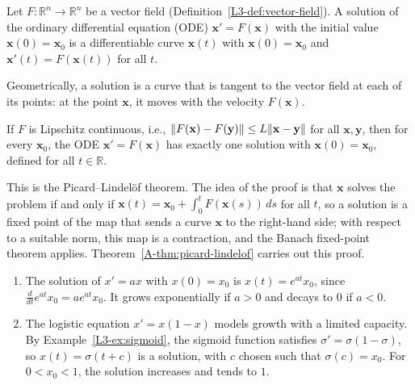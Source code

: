 \begin{definition}\label{L3-def:ode}
    Let $F: \mathbb{R}^n \to \mathbb{R}^n$ be a vector field (Definition~\ref{L3-def:vector-field}). A solution of the ordinary differential equation (ODE) $\mathbf{x}' = F(\mathbf{x})$ with the initial value $\mathbf{x}(0) = \mathbf{x}_0$ is a differentiable curve $\mathbf{x}(t)$ with $\mathbf{x}(0) = \mathbf{x}_0$ and $\mathbf{x}'(t) = F(\mathbf{x}(t))$ for all $t$.
\end{definition}

Geometrically, a solution is a curve that is tangent to the vector field at each of its points: at the point $\mathbf{x}$, it moves with the velocity $F(\mathbf{x})$.

\begin{theorem}\label{L3-thm:picard}
    If $F$ is Lipschitz continuous, i.e., $\lVert F(\mathbf{x}) - F(\mathbf{y}) \rVert \leq L\lVert \mathbf{x} - \mathbf{y} \rVert$ for all $\mathbf{x}, \mathbf{y}$, then for every $\mathbf{x}_0$, the ODE $\mathbf{x}' = F(\mathbf{x})$ has exactly one solution with $\mathbf{x}(0) = \mathbf{x}_0$, defined for all $t \in \mathbb{R}$.
\end{theorem}

This is the Picard--Lindel\"of theorem. The idea of the proof is that $\mathbf{x}$ solves the problem if and only if $\mathbf{x}(t) = \mathbf{x}_0 + \int_0^t F(\mathbf{x}(s))\, ds$ for all $t$, so a solution is a fixed point of the map that sends a curve $\mathbf{x}$ to the right-hand side; with respect to a suitable norm, this map is a contraction, and the Banach fixed-point theorem applies. Theorem~\ref{A-thm:picard-lindelof} carries out this proof.

\begin{example}\label{L3-ex:scalar-ode}
    \begin{enumerate}
        \item The solution of $x' = ax$ with $x(0) = x_0$ is $x(t) = e^{at}x_0$, since $\frac{d}{dt}e^{at}x_0 = ae^{at}x_0$. It grows exponentially if $a > 0$ and decays to $0$ if $a < 0$.
        \item The logistic equation $x' = x(1 - x)$ models growth with a limited capacity. By Example~\ref{L3-ex:sigmoid}, the sigmoid function satisfies $\sigma' = \sigma(1 - \sigma)$, so $x(t) = \sigma(t + c)$ is a solution, with $c$ chosen such that $\sigma(c) = x_0$. For $0 < x_0 < 1$, the solution increases and tends to $1$.
    \end{enumerate}
\end{example}


